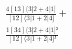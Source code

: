 \documentclass[varwidth, border=5pt]{standalone}
\begin{document}
\begin{my}
$\begin{gathered}
\scriptscriptstyle\frac{4[13]⟨3|2+4|1]}{[12]⟨3|1+2|4]} +\\
\scriptscriptstyle\frac{1[34]⟨3|2+4|1]²}{[12]⟨3|1+2|4]²} \phantom{+}
\end{gathered}$
\end{my}
\end{document}
